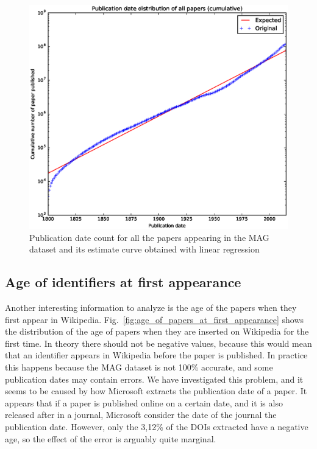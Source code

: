 \begin{figure}[h]
\centering
\includegraphics[keepaspectratio=true, width=\textwidth]{assets/publication_date_regression}
\caption{Publication date count for all the papers appearing in the \ac{MAG} dataset and its estimate curve obtained with linear regression}
\label{fig:publication_date_regression}
\end{figure}



\subsection{Age of identifiers at first appearance}
Another interesting information to analyze is the age of the papers when they first appear in Wikipedia.
Fig.~\ref{fig:age_of_papers_at_first_appearance} shows the distribution of the age of papers when they are inserted on Wikipedia for the first time.
In theory there should not be negative values, because this would mean that an identifier appears in Wikipedia before the paper is published.
In practice this happens because the \ac{MAG} dataset is not 100\% accurate, and some publication dates may contain errors.
We have investigated this problem, and it seems to be caused by how Microsoft extracts the publication date of a paper.
It appears that if a paper is published online on a certain date, and it is also released after in a journal, Microsoft consider the date of the journal the publication date.
However, only the 3,12\% of the \acp{DOI} extracted have a negative age, so the effect of the error is arguably quite marginal.

